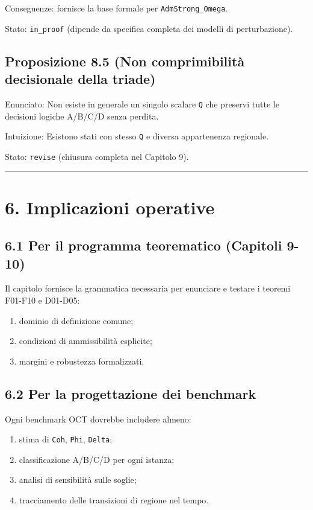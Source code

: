 Conseguenze:
fornisce la base formale per \texttt{AdmStrong\_Omega}.

Stato: \texttt{in\_proof} (dipende da specifica completa dei modelli di perturbazione).

\subsection{Proposizione 8.5 (Non comprimibilità decisionale della triade)}

Enunciato:
Non esiste in generale un singolo scalare \texttt{Q} che preservi tutte le decisioni logiche A/B/C/D senza perdita.

Intuizione:
Esistono stati con stesso \texttt{Q} e diversa appartenenza regionale.

Stato: \texttt{revise} (chiusura completa nel Capitolo 9).

\begin{center}\rule{0.5\linewidth}{0.5pt}\end{center}

\section{6. Implicazioni operative}

\subsection{6.1 Per il programma teorematico (Capitoli 9-10)}

Il capitolo fornisce la grammatica necessaria per enunciare e testare i teoremi F01-F10 e D01-D05:

\begin{enumerate}
\def\labelenumi{\arabic{enumi}.}
\tightlist
\item
  dominio di definizione comune;
\item
  condizioni di ammissibilità esplicite;
\item
  margini e robustezza formalizzati.
\end{enumerate}

\subsection{6.2 Per la progettazione dei benchmark}

Ogni benchmark OCT dovrebbe includere almeno:

\begin{enumerate}
\def\labelenumi{\arabic{enumi}.}
\tightlist
\item
  stima di \texttt{Coh}, \texttt{Phi}, \texttt{Delta};
\item
  classificazione A/B/C/D per ogni istanza;
\item
  analisi di sensibilità sulle soglie;
\item
  tracciamento delle transizioni di regione nel tempo.
\end{enumerate}

